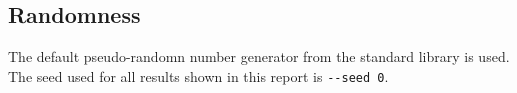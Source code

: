 \subsection{Randomness}

The default pseudo-randomn number generator from the  standard library is used.
The seed used for all results shown in this report is \verb!--seed 0!.